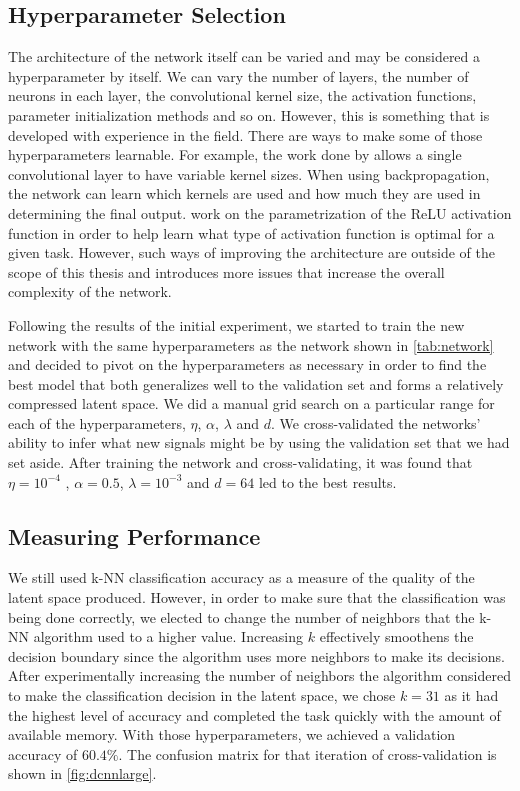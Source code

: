 \subsection{Hyperparameter Selection}
The architecture of the network itself can be varied and may be considered a hyperparameter by itself. We can vary the number of layers, the number of neurons in each layer, the convolutional kernel size, the activation functions, parameter initialization methods and so on. However, this is something that is developed with experience in the field. There are ways to make some of those hyperparameters learnable. For example, the work done by \citet{inception} allows a single convolutional layer to have variable kernel sizes. When using backpropagation, the network can learn which kernels are used and how much they are used in determining the final output. \citet{prelu} work on the parametrization of the ReLU activation function in order to help learn what type of activation function is optimal for a given task. However, such ways of improving the architecture are outside of the scope of this thesis and introduces more issues that increase the overall complexity of the network. 

Following the results of the initial experiment, we started to train the new network with the same hyperparameters as the network shown in \cref{tab:network} and decided to pivot on the hyperparameters as necessary in order to find the best model that both generalizes well to the validation set and forms a relatively compressed latent space. We did a manual grid search on a particular range for each of the hyperparameters, $\eta$, $\alpha$, $\lambda$ and $d$. We cross-validated the networks' ability to infer what new signals might be by using the validation set that we had set aside. After training the network and cross-validating, it was found that $\eta=10^{-4}$ , $\alpha=0.5$, $\lambda = 10^{-3}$ and $d=64$ led to the best results. 

\subsection{Measuring Performance}

We still used k-NN classification accuracy as a measure of the quality of the latent space produced. However, in order to make sure that the classification was being done correctly, we elected to change the number of neighbors that the k-NN algorithm used to a higher value. Increasing $k$ effectively smoothens the decision boundary since the algorithm uses more neighbors to make its decisions. After experimentally increasing the number of neighbors the algorithm considered to make the classification decision in the latent space, we chose $k=31$ as it had the highest level of accuracy and completed the task quickly with the amount of available memory.  With those hyperparameters, we achieved a validation accuracy of $60.4\%$. The confusion matrix for that iteration of cross-validation is shown in \cref{fig:dcnnlarge}. 

